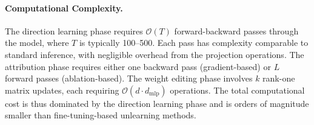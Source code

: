 \paragraph{Computational Complexity.}
The direction learning phase requires $\mathcal{O}(T)$ forward-backward passes through the model, where $T$ is typically 100--500. Each pass has complexity comparable to standard inference, with negligible overhead from the projection operations. The attribution phase requires either one backward pass (gradient-based) or $L$ forward passes (ablation-based). The weight editing phase involves $k$ rank-one matrix updates, each requiring $\mathcal{O}(d \cdot d_{\text{mlp}})$ operations. The total computational cost is thus dominated by the direction learning phase and is orders of magnitude smaller than fine-tuning-based unlearning methods.

